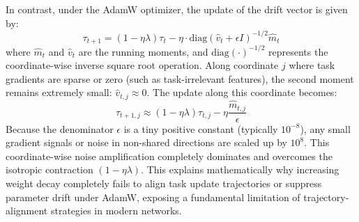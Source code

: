 \documentclass{article}
\theoremstyle{plain}
\theoremstyle{definition}
\theoremstyle{remark}
\begin{document}
In contrast, under the AdamW optimizer, the update of the drift vector is given by:
\begin{equation}
    \tau_{t+1} = (1 - \eta \lambda) \tau_t - \eta \cdot \text{diag}(\hat{v}_t + \epsilon I)^{-1/2} \hat{m}_t
\end{equation}
where $\hat{m}_t$ and $\hat{v}_t$ are the running moments, and $\text{diag}(\cdot)^{-1/2}$ represents the coordinate-wise inverse square root operation. Along coordinate $j$ where task gradients are sparse or zero (such as task-irrelevant features), the second moment remains extremely small: $\hat{v}_{t, j} \approx 0$. The update along this coordinate becomes:
\begin{equation}
    \tau_{t+1, j} \approx (1 - \eta \lambda) \tau_{t, j} - \eta \frac{\hat{m}_{t, j}}{\epsilon}
\end{equation}
Because the denominator $\epsilon$ is a tiny positive constant (typically $10^{-8}$), any small gradient signals or noise in non-shared directions are scaled up by $10^8$. This coordinate-wise noise amplification completely dominates and overcomes the isotropic contraction $(1 - \eta \lambda)$. This explains mathematically why increasing weight decay completely fails to align task update trajectories or suppress parameter drift under AdamW, exposing a fundamental limitation of trajectory-alignment strategies in modern networks.
\end{document}
